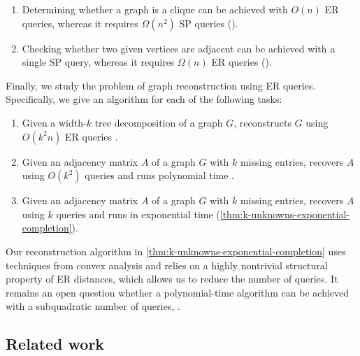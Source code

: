 \begin{enumerate}[(1)]
    \item Determining whether a graph is a clique can be achieved with $O(n)$ ER queries, whereas it requires $\Omega(n^2)$ SP queries ().
    \item Checking whether two given vertices are adjacent can be achieved with a single SP query, whereas it requires $\Omega(n)$ ER queries ().
\end{enumerate}

Finally, we study the problem of graph reconstruction using ER queries. Specifically, we give an algorithm for each of the following tasks:
\begin{enumerate}[(1)]
\item Given a width-$k$ tree decomposition of a graph $G$, reconstructs $G$ using $O(k^2 n)$ ER queries .
\item Given an adjacency matrix $A$ of a graph $G$ with $k$ missing entries, recovers $A$ using $O(k^2)$ queries and runs polynomial time .
\item Given an adjacency matrix $A$ of a graph $G$ with $k$ missing entries, recovers $A$ using $k$ queries and runs in exponential time (\cref{thm:k-unknowns-exponential-completion}).
\end{enumerate}

Our reconstruction algorithm in \cref{thm:k-unknowns-exponential-completion} uses techniques from convex analysis and relies on a highly nontrivial structural property of ER distances, which allows us to reduce the number of queries. It remains an open question whether a polynomial-time algorithm can be achieved with a subquadratic number of queries, .


\subsection{Related work}
